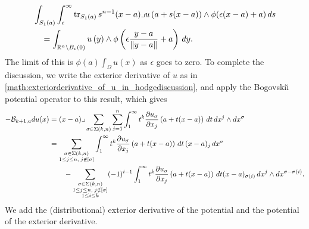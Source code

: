 \documentclass[10pt,a4paper]{article}
\begin{document}
\begin{align*}
    & 
    \int_{ S_1(a) }
    \int_{\epsilon}^\infty 
    \operatorname{tr}_{S_1(a)}{ 
        s^{n-1} (x-a)\lrcorner u\left( a + s( x - a )\right) 
        \wedge \phi( \epsilon (x-a) + a ) 
    }
    \,ds 
    \\&\quad 
    =
    \int_{{\mathbb R}^{n} \setminus B_{\epsilon}(0)}
        u\left( y \right) 
        \wedge \phi\left( \epsilon \frac{y-a}{\|y-a\|} + a \right) 
    \,dy 
    .
\end{align*}
The limit of this is $\phi(a) \int_\Omega u(x)$ as $\epsilon$ goes to zero. 
To complete the discussion, we write the exterior derivative of $u$ as in \eqref{math:exteriorderivative_of_u_in_hodgediscussion}, 
and apply the Bogovski\u{\i} potential operator to this result, which gives 
\begin{align*}
    - 
    {\mathcal B}_{k+1,a} d u(x)
    &=
    (x-a)\lrcorner 
    \sum_{\sigma \in \Sigma(k,n)} \sum_{j=1}^{n}
    \int_{1}^\infty t^{k} \frac{ \partial u_{\sigma} }{\partial x_{j}}\left(a+t(x-a)\right) \,dt 
    \,dx^{j} \wedge dx^{\sigma}
    \\&
    = 
    \sum_{\substack{ \sigma \in \Sigma(k,n) \\ 1 \leq j \leq n, \; j \notin [\sigma] }} 
    \int_{1}^\infty t^{k} \frac{ \partial u_{\sigma} }{\partial x_{j}}\left(a+t(x-a)\right) \,dt \,(x-a)_{j} \,dx^{\sigma}
    \\&\qquad 
    - 
    \sum_{\substack{ \sigma \in \Sigma(k,n) \\ 1 \leq j \leq n, \; j \notin [\sigma] \\ 1 \leq i \leq k }}
    (-1)^{i-1}
    \int_{1}^\infty t^{k} \frac{ \partial u_{\sigma} }{\partial x_{j}}\left(a+t(x-a)\right) \,dt 
    (x-a)_{\sigma(i)} \,dx^{j} \wedge dx^{\sigma-\sigma(i)}
    .
\end{align*}
We add the (distributional) exterior derivative of the potential and the potential of the exterior derivative.
\end{document}
